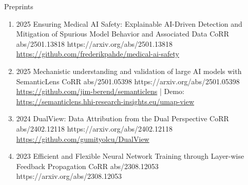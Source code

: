 \headedsubsection %
{Preprints}{}
{
    \begin{enumerate}
       
        \item {}
                        {2025}
                        {Ensuring Medical AI Safety: Explainable AI-Driven Detection and Mitigation of Spurious Model Behavior and Associated Data}
                        {CoRR abs/2501.13818}
                        {https://arxiv.org/abs/2501.13818}
                        {
                            \\\href{https://github.com/frederikpahde/medical-ai-safety}{https://github.com/frederikpahde/medical-ai-safety}
                        }

        \item {}
                        {2025}
                        {Mechanistic understanding and validation of large AI models with SemanticLens}
                        {CoRR abs/2501.05398}
                        {https://arxiv.org/abs/2501.05398}
                        {
                            \\\href{https://github.com/jim-berend/semanticlens}{https://github.com/jim-berend/semanticlens} | Demo: \href{https://semanticlens.hhi-research-insights.eu/umap-view}{https://semanticlens.hhi-research-insights.eu/umap-view}
                        }

        \item {}
                        {2024}
                        {DualView: Data Attribution from the Dual Perspective}
                        {CoRR abs/2402.12118}
                        {https://arxiv.org/abs/2402.12118}
                        {\\\href{https://github.com/gumityolcu/DualView}{https://github.com/gumityolcu/DualView}}

        \item {}
                        {2023}
                        {Efficient and Flexible Neural Network Training through Layer-wise Feedback Propagation}
                        {CoRR abs/2308.12053}
                        {https://arxiv.org/abs/2308.12053}


\end{enumerate}}
